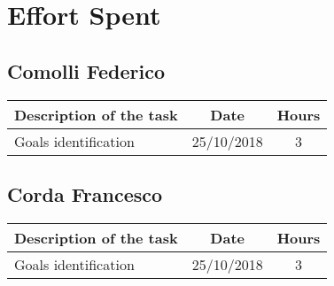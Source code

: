 \section{Effort Spent}

\subsection{Comolli Federico}
\begin{center}
\begin{tabular}{l c c}
{\bf Description of the task}&{\bf Date}&{\bf Hours}\\ \hline
Goals identification & {25/10/2018} & {3} \\ \hline
\end{tabular}
\end{center}

\subsection{Corda Francesco}
\begin{center}
\begin{tabular}{l c c}
{\bf Description of the task}&{\bf Date}&{\bf Hours}\\ \hline
Goals identification & {25/10/2018} & {3} \\ \hline
\end{tabular}
\end{center}